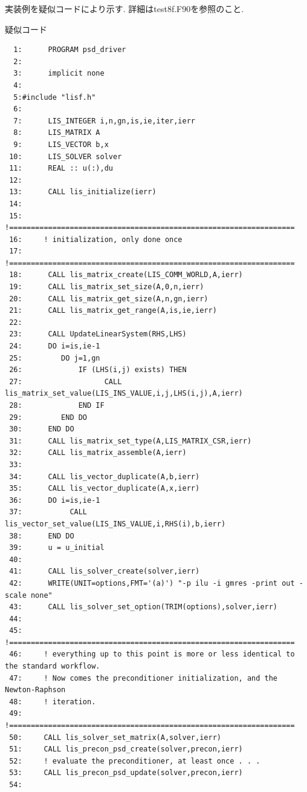 \documentclass[a4paper]{jarticle}
\begin{document}
{{\vspace{1pc}

実装例を疑似コードにより示す. 詳細はtest8f.F90を参照のこと. 

\vspace{1pc}

\begin{itembox}[l]{疑似コード}
{\small
\begin{verbatim}
  1:      PROGRAM psd_driver
  2:
  3:      implicit none
  4:      
  5:#include "lisf.h"
  6:
  7:      LIS_INTEGER i,n,gn,is,ie,iter,ierr
  8:      LIS_MATRIX A
  9:      LIS_VECTOR b,x
 10:      LIS_SOLVER solver
 11:      REAL :: u(:),du
 12:
 13:      CALL lis_initialize(ierr)
 14:
 15:     !==================================================================
 16:     ! initialization, only done once
 17:     !==================================================================
 18:      CALL lis_matrix_create(LIS_COMM_WORLD,A,ierr)
 19:      CALL lis_matrix_set_size(A,0,n,ierr)
 20:      CALL lis_matrix_get_size(A,n,gn,ierr)
 21:      CALL lis_matrix_get_range(A,is,ie,ierr)
 22:
 23:      CALL UpdateLinearSystem(RHS,LHS)
 24:      DO i=is,ie-1
 25:         DO j=1,gn
 26:             IF (LHS(i,j) exists) THEN
 27:                   CALL lis_matrix_set_value(LIS_INS_VALUE,i,j,LHS(i,j),A,ierr)
 28:             END IF
 29:         END DO
 30:      END DO
 31:      CALL lis_matrix_set_type(A,LIS_MATRIX_CSR,ierr)
 32:      CALL lis_matrix_assemble(A,ierr)
 33:
 34:      CALL lis_vector_duplicate(A,b,ierr)
 35:      CALL lis_vector_duplicate(A,x,ierr)
 36:      DO i=is,ie-1
 37:           CALL lis_vector_set_value(LIS_INS_VALUE,i,RHS(i),b,ierr)
 38:      END DO
 39:      u = u_initial
 40:
 41:      CALL lis_solver_create(solver,ierr)
 42:      WRITE(UNIT=options,FMT='(a)') "-p ilu -i gmres -print out -scale none"
 43:      CALL lis_solver_set_option(TRIM(options),solver,ierr)
 44:
 45:     !==================================================================
 46:     ! everything up to this point is more or less identical to the standard workflow.
 47:     ! Now comes the preconditioner initialization, and the Newton-Raphson
 48:     ! iteration.
 49:     !==================================================================
 50:     CALL lis_solver_set_matrix(A,solver,ierr)
 51:     CALL lis_precon_psd_create(solver,precon,ierr)
 52:     ! evaluate the preconditioner, at least once . . .
 53:     CALL lis_precon_psd_update(solver,precon,ierr)
 54:
\end{verbatim}
}
\end{itembox}

}}
\end{document}
